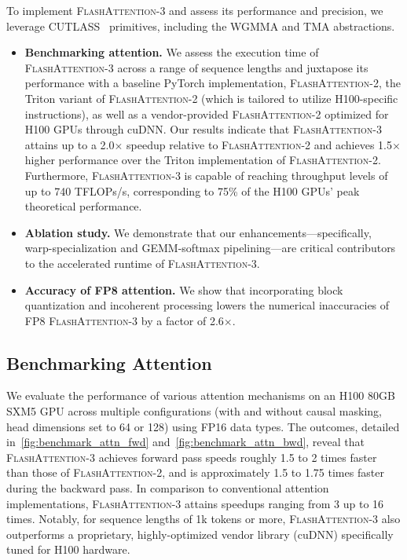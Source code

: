 To implement \textsc{FlashAttention-3} and assess its performance and precision, we leverage CUTLASS~\citep{Thakkar_CUTLASS_2023} primitives, including the WGMMA and TMA abstractions.

\begin{itemize}

\item \textbf{Benchmarking attention.} We assess the execution time of \textsc{FlashAttention-3} across a range of sequence lengths and juxtapose its performance with a baseline PyTorch implementation, \textsc{FlashAttention-2}, the Triton variant of \textsc{FlashAttention-2} (which is tailored to utilize H100-specific instructions), as well as a vendor-provided \textsc{FlashAttention-2} optimized for H100 GPUs through cuDNN. Our results indicate that \textsc{FlashAttention-3} attains up to a 2.0$\times$ speedup relative to \textsc{FlashAttention-2} and achieves 1.5$\times$ higher performance over the Triton implementation of \textsc{FlashAttention-2}. Furthermore, \textsc{FlashAttention-3} is capable of reaching throughput levels of up to 740 TFLOPs/s, corresponding to 75\% of the H100 GPUs' peak theoretical performance.
\item \textbf{Ablation study.} We demonstrate that our enhancements—specifically, warp-specialization and GEMM-softmax pipelining—are critical contributors to the accelerated runtime of \textsc{FlashAttention-3}.
\item \textbf{Accuracy of FP8 attention.} We show that incorporating block quantization and incoherent processing lowers the numerical inaccuracies of FP8 \textsc{FlashAttention-3} by a factor of 2.6$\times$.
\end{itemize}

\subsection{Benchmarking Attention}
\label{subsec:benchmark_attn}

We evaluate the performance of various attention mechanisms on an H100 80GB SXM5 GPU across multiple configurations (with and without causal masking, head dimensions set to 64 or 128) using FP16 data types. The outcomes, detailed in~\cref{fig:benchmark_attn_fwd} and~\cref{fig:benchmark_attn_bwd}, reveal that \textsc{FlashAttention-3} achieves forward pass speeds roughly 1.5 to 2 times faster than those of \textsc{FlashAttention-2}, and is approximately 1.5 to 1.75 times faster during the backward pass. In comparison to conventional attention implementations, \textsc{FlashAttention-3} attains speedups ranging from 3 up to 16 times. Notably, for sequence lengths of 1k tokens or more, \textsc{FlashAttention-3} also outperforms a proprietary, highly-optimized vendor library (cuDNN) specifically tuned for H100 hardware.

